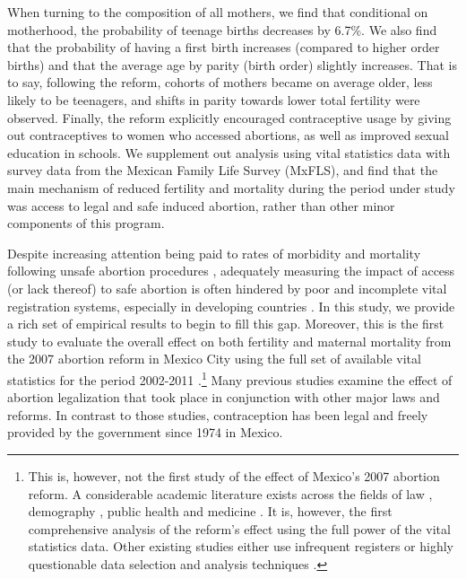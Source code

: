 \documentclass[a4paper, 11pt]{article}
\begin{document}
\begin{spacing}{2}
When turning to the composition of all mothers, we find that conditional on motherhood, the probability of teenage births decreases by 6.7\%. We also find that the probability of having a first birth increases (compared to higher order births) and that the average age by parity (birth order) slightly %
 increases.  That is to say, following the reform, cohorts of mothers became on average older, less likely to be teenagers, and shifts in parity towards lower total fertility were observed.  Finally, the reform explicitly encouraged contraceptive usage by giving out contraceptives to women who accessed abortions, as well as improved sexual education in schools. We supplement out analysis using vital statistics data with survey data from the Mexican Family Life Survey (MxFLS), and find that the main mechanism of reduced fertility and mortality during the period under study was access to legal and safe induced abortion, rather than other minor components of this program.   

Despite increasing attention being paid to rates of morbidity and mortality following unsafe abortion procedures \citep{Grimes2006,Brown2007,Kulczycki2011}, adequately measuring the impact of access (or lack thereof) to safe abortion is often hindered by poor and incomplete vital registration systems, especially in developing countries \citep{Grimes2006}.  In this study, we provide a rich set of empirical results to begin to fill this gap.  Moreover, this is the first study to evaluate the overall effect on both fertility and maternal mortality from the 2007 abortion reform in Mexico City using the full set of available vital statistics for the period 2002-2011 %
.\footnote{This is, however, not the first study of the effect of Mexico's 2007 abortion reform.  A considerable academic literature exists across the fields of law \citep{Johnson2013}, demography \citep{Contreras2011}, public health \citep{Schiavonetal2010,Becker2013,Kalb} and medicine \citep{Madrazo2009}.  It is, however, the first comprehensive analysis of the reform's effect using the full power of the vital statistics data.  Other existing studies either use infrequent registers \citep{Gutierrez2015} or highly questionable data selection and analysis techniques \citep{Koch01022015}.%
	}  Many previous studies examine the effect of abortion legalization that took place in conjunction with other major laws and reforms. In contrast to those studies, contraception has been legal and freely provided by the government since 1974 in Mexico.


\end{spacing}
\end{document}
